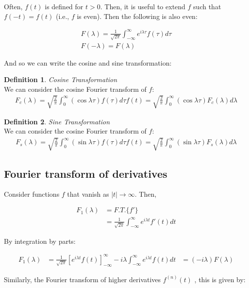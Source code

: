 \documentclass{article}
\theoremstyle{definition}
\newtheorem{definition}{Definition}[section]
\newcommand{\Def}[2]{
\begin{shaded*}
\begin{definition}{\textit{#1}}\\#2\end{definition}
\end{shaded*}
}
\begin{document}
Often, $f(t)$ is defined for $t>0$. Then, it is useful to extend $f$ such that $f(-t) = f(t)$ (i.e., $f$ is even). Then the following is also even:

\begin{align*}
F(\lambda) = \frac{1}{\sqrt{2\pi}}\int_{-\infty}^{\infty}  e^{i\lambda \tau} f(\tau) d\tau\\
F(-\lambda) = F(\lambda)
\end{align*}

And so we can write the cosine and sine transformation:
\Def{Cosine Transformation}{
	
We can consider the cosine Fourier transform of $f$:
\begin{align*}
F_c(\lambda) = \sqrt{\frac{2}{\pi}} \int_{0}^{\infty} (\cos \lambda \tau ) f(\tau) d\tau
f(t) = \sqrt{\frac{2}{\pi}} \int_{0}^{\infty} (\cos \lambda \tau ) F_c(\lambda) d\lambda
\end{align*}
}

\Def{Sine Transformation}{
	
	We can consider the cosine Fourier transform of $f$:
	\begin{align*}
	F_s(\lambda) = \sqrt{\frac{2}{\pi}} \int_{0}^{\infty} (\sin \lambda \tau ) f(\tau) d\tau
	f(t) = \sqrt{\frac{2}{\pi}} \int_{0}^{\infty} (\sin \lambda \tau ) F_s(\lambda) d\lambda
	\end{align*}
}

\subsection{Fourier transform of derivatives}

Consider functions $f$ that vanish as $|t| \to \infty$. Then, 

\begin{align*}
F_1(\lambda) &= F.T. \{f'\}\\
& = \frac{1}{\sqrt{2 \pi}} \int_{-\infty}^{\infty}  e^{i\lambda t} f'(t) dt
\end{align*}

By integration by parts:

\begin{align*}
F_1(\lambda) & = \frac{1}{\sqrt{2 \pi}} \left[e^{i\lambda t} f(t) \right]_{-\infty }^\infty - i \lambda \int_{-\infty}^{\infty}  e^{i\lambda t} f(t) dt
&= (-i\lambda) F(\lambda)
\end{align*}

Similarly, the Fourier transform of higher derivatives $f^{(n)}(t)$ , this is given by:
\end{document}
